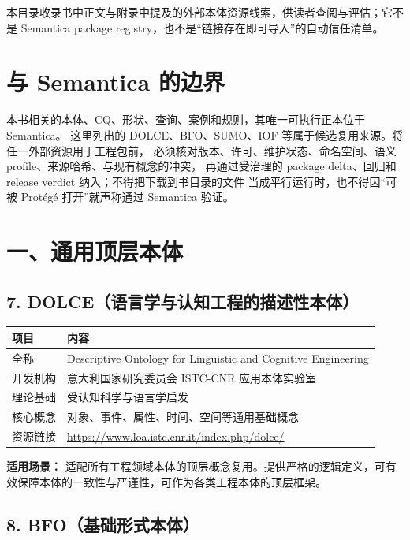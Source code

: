 
\begin{noteblock}
本目录收录书中正文与附录中提及的外部本体资源线索，供读者查阅与评估；它不是
Semantica package registry，也不是“链接存在即可导入”的自动信任清单。
\end{noteblock}

\section{与 Semantica 的边界}

本书相关的本体、CQ、形状、查询、案例和规则，其唯一可执行正本位于 Semantica。
这里列出的 DOLCE、BFO、SUMO、IOF 等属于候选复用来源。将任一外部资源用于工程包前，
必须核对版本、许可、维护状态、命名空间、语义 profile、来源哈希、与现有概念的冲突，
再通过受治理的 package delta、回归和 release verdict 纳入；不得把下载到书目录的文件
当成平行运行时，也不得因“可被 Protégé 打开”就声称通过 Semantica 验证。


\section{一、通用顶层本体}

\subsection{7. DOLCE（语言学与认知工程的描述性本体）}

\begin{center}
\begin{tabularx}{\linewidth}{@{}lX@{}}
\toprule
\textbf{项目} & \textbf{内容} \\
\midrule
全称 & Descriptive Ontology for Linguistic and Cognitive Engineering \\
开发机构 & 意大利国家研究委员会 ISTC-CNR 应用本体实验室 \\
理论基础 & 受认知科学与语言学启发 \\
核心概念 & 对象、事件、属性、时间、空间等通用基础概念 \\
资源链接 & \url{https://www.loa.istc.cnr.it/index.php/dolce/} \\
\bottomrule
\end{tabularx}
\end{center}
\color{black}

\textbf{适用场景：} 适配所有工程领域本体的顶层概念复用。提供严格的逻辑定义，可有效保障本体的一致性与严谨性，可作为各类工程本体的顶层框架。


\subsection{8. BFO（基础形式本体）}

